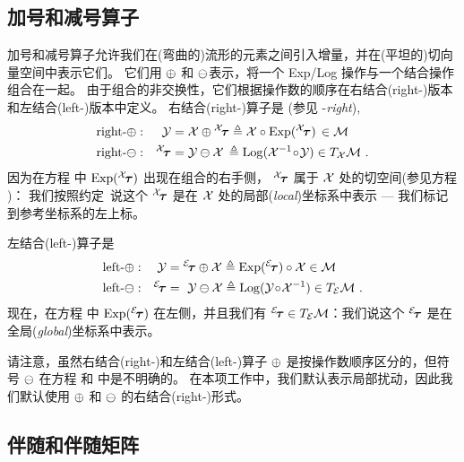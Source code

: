 \subsection{加号和减号算子}

加号和减号算子允许我们在(弯曲的)流形的元素之间引入增量，并在(平坦的)切向量空间中表示它们。 
它们用 $\oplus$ 和 $\ominus$表示，将一个 Exp/Log 操作与一个结合操作组合在一起。
由于组合的非交换性，它们根据操作数的顺序在右结合(right-)版本和左结合(left-)版本中定义。
右结合(right-)算子是 (参见 -\emph{right}), 
%
\begin{align}
\textrm{right-}\oplus:&& \mathcal{Y} &= \mathcal{X}\oplus{^{\mathcal{X}}\!{\bm \tau}} \triangleq \mathcal{X}\circ\operatorname*{Exp}({^{\mathcal{X}}\!{\bm \tau}}) \,\in \mathcal{M} \label{equ:rplus} \\
\textrm{right-}\ominus:&& {^{\mathcal{X}}\!{\bm \tau}} &= \mathcal{Y}\ominus\mathcal{X} \,\triangleq \operatorname*{Log}(\mathcal{X}^{-1}\!\circ\!\mathcal{Y})\in T_{\mathcal{X}}{\mathcal{M}} \label{equ:rminus}
~.
\end{align}
%
因为在方程  中 $\operatorname*{Exp}({^{\mathcal{X}}\!{\bm \tau}})$ 出现在组合的右手侧，
${^{\mathcal{X}}\!{\bm \tau}}$ 属于 $\mathcal{X}$ 处的切空间(参见方程 )： 
我们按照约定\footnotemark~说这个 ${^{\mathcal{X}}\!{\bm \tau}}$ 是在 $\mathcal{X}$ 处的局部(\emph{local})坐标系中表示 --- 我们标记到参考坐标系的左上标。

左结合(left-)算子是
\begin{align}
\textrm{left-}\oplus:&&\mathcal{Y}&={^{\mathcal{E}}\!{\bm \tau}}\oplus\mathcal{X} \triangleq \operatorname*{Exp}({^{\mathcal{E}}\!{\bm \tau}})\circ\mathcal{X} \in \mathcal{M} \label{equ:lplus} \\
\textrm{left-}\ominus:&&{^{\mathcal{E}}\!{\bm \tau}}&=~\mathcal{Y}\ominus\mathcal{X} \triangleq \operatorname*{Log}(\mathcal{Y}\!\circ\!\mathcal{X}^{-1})\in T_{\mathcal{E}}{\mathcal{M}}
\label{equ:lminus}
~.
\end{align}
%
现在，在方程  中 $\operatorname*{Exp}({^{\mathcal{E}}\!{\bm \tau}})$ 在左侧，并且我们有 ${{^{\mathcal{E}}\!{\bm \tau}}\in T_{\mathcal{E}}{\mathcal{M}}}$：我们说这个 ${{^{\mathcal{E}}}\!{\bm \tau}}$ 是在全局(\emph{global})坐标系中表示。

请注意，虽然右结合(right-)和左结合(left-)算子 $\oplus$ 是按操作数顺序区分的，但符号 $\ominus$ 在方程  和  中是不明确的。
在本项工作中，我们默认表示局部扰动，因此我们默认使用 $\oplus$ 和 $\ominus$ 的右结合(right-)形式。


\subsection[Adjoint, and adjoint matrix]{伴随和伴随矩阵}
\label{sec:adjoint}

